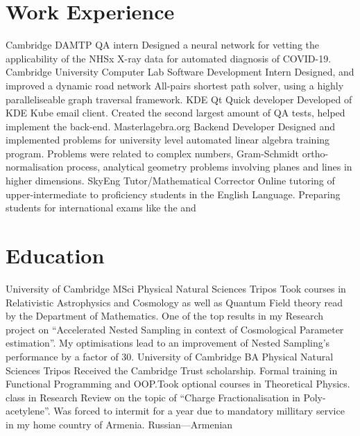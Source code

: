 \documentclass{CurriculumVitae}[10pt, draft, condensed]
\begin{document}
 \section*{Work Experience}
 {\setlength{\parindent}{0in}
    {Cambridge DAMTP} {QA intern} {Designed a neural
     network for vetting the applicability of the NHSx X-ray data for
     automated diagnosis of COVID-19. }  
   {Cambridge University Computer Lab} {Software Development Intern}
   {Designed, and improved a dynamic road network All-pairs shortest
     path solver, using a highly paralleliseable graph traversal
     framework. }   {KDE} {Qt Quick developer}
   {Developed of KDE Kube email client. Created the second largest
     amount of QA tests, helped implement the  back-end. }
    {Masterlagebra.org} {Backend Developer}
   {Designed and implemented problems for university level automated
     linear algebra training program. Problems were related to complex
     numbers, Gram-Schmidt ortho-normalisation process, analytical
     geometry problems involving planes and lines in higher
     dimensions. }   {SkyEng}
   {Tutor/Mathematical Corrector} {Online tutoring of
     upper-intermediate to proficiency students in the English
     Language. Preparing students for international exams like the
       and
     }  \section*{Education} 
   {University of Cambridge} {MSci } { Physical Natural
     Sciences Tripos} {Took courses in Relativistic Astrophysics and
     Cosmology as well as Quantum Field theory read by the Department
     of Mathematics. One of the top results in my Research project on
     ``Accelerated Nested Sampling in context of Cosmological
     Parameter estimation''. My optimisations lead to an improvement
     of Nested Sampling's performance by a factor of 30. }
    {University of Cambridge} {BA
     }{Physical Natural Sciences Tripos} {Received the
     Cambridge Trust scholarship. Formal training in Functional
     Programming and OOP.\@ Took optional courses in Theoretical
     Physics.  class in Research Review on the topic of
     ``Charge Fractionalisation in Poly-acetylene''. Was forced to
     intermit for a year due to mandatory millitary service in my home
     country of Armenia. }   {Russian---Armenian
}}
\end{document}
